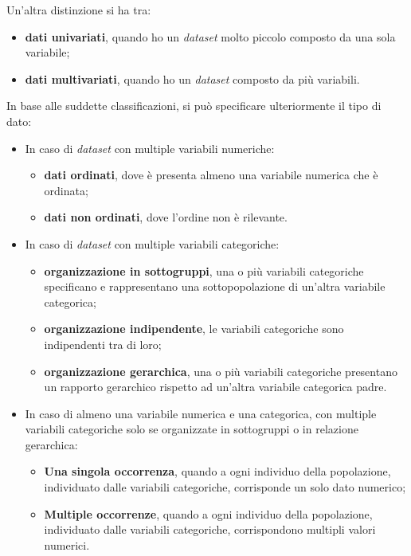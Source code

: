 \bigskip
\noindent Un'altra distinzione si ha tra:
\begin{itemize}
    \item \textbf{dati univariati}, quando ho un \emph{dataset} molto piccolo composto da una sola variabile;
    \item \textbf{dati multivariati}, quando ho un \emph{dataset} composto da più variabili.
\end{itemize}

\bigskip
\noindent In base alle suddette classificazioni, si può specificare ulteriormente il tipo di dato:
\begin{itemize}
    \item In caso di \emph{dataset} con multiple variabili numeriche:
    \begin{itemize}
        \item \textbf{dati ordinati}, dove è presenta almeno una variabile numerica che è ordinata;
        \item \textbf{dati non ordinati}, dove l'ordine non è rilevante.
    \end{itemize}
    \item In caso di \emph{dataset} con multiple variabili categoriche:
    \begin{itemize}
        \item \textbf{organizzazione in sottogruppi}, una o più variabili categoriche specificano e rappresentano una sottopopolazione di un'altra variabile categorica;
        \item \textbf{organizzazione indipendente}, le variabili categoriche sono indipendenti tra di loro;
        \item \textbf{organizzazione gerarchica}, una o più variabili categoriche presentano un rapporto gerarchico rispetto ad un'altra variabile categorica padre.
    \end{itemize}
    \item In caso di almeno una variabile numerica e una categorica, con multiple variabili categoriche solo se organizzate in sottogruppi o in relazione gerarchica:
    \begin{itemize}
        \item \textbf{Una singola occorrenza}, quando a ogni individuo della popolazione, individuato dalle variabili categoriche, corrisponde un solo dato numerico;
        \item \textbf{Multiple occorrenze}, quando a ogni individuo della popolazione, individuato dalle variabili categoriche, corrispondono multipli valori numerici.
    \end{itemize}
\end{itemize}


